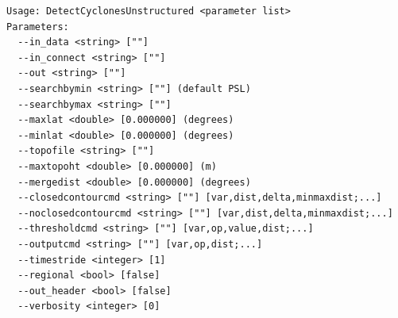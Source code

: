 \documentclass[gmdd, hvmath, online]{copernicus_discussions}
\begin{document}
\begin{verbatim}
Usage: DetectCyclonesUnstructured <parameter list>
Parameters:
  --in_data <string> [""] 
  --in_connect <string> [""] 
  --out <string> [""] 
  --searchbymin <string> [""] (default PSL)
  --searchbymax <string> [""] 
  --maxlat <double> [0.000000] (degrees)
  --minlat <double> [0.000000] (degrees)
  --topofile <string> [""] 
  --maxtopoht <double> [0.000000] (m)
  --mergedist <double> [0.000000] (degrees)
  --closedcontourcmd <string> [""] [var,dist,delta,minmaxdist;...]
  --noclosedcontourcmd <string> [""] [var,dist,delta,minmaxdist;...]
  --thresholdcmd <string> [""] [var,op,value,dist;...]
  --outputcmd <string> [""] [var,op,dist;...]
  --timestride <integer> [1] 
  --regional <bool> [false] 
  --out_header <bool> [false] 
  --verbosity <integer> [0] 
\end{verbatim}
\end{document}
